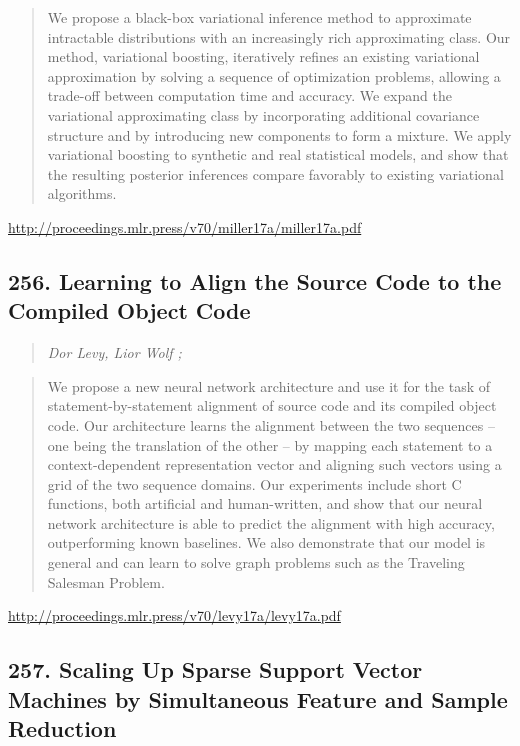 \documentclass{article}
\begin{document}
\begin{quote}
    We propose a black-box variational inference method to approximate intractable distributions with an increasingly rich approximating class. Our method, variational boosting, iteratively refines an existing variational approximation by solving a sequence of optimization problems, allowing a trade-off between computation time and accuracy. We expand the variational approximating class by incorporating additional covariance structure and by introducing new components to form a mixture. We apply variational boosting to synthetic and real statistical models, and show that the resulting posterior inferences compare favorably to existing variational algorithms.  \end{quote}

\href{http://proceedings.mlr.press/v70/miller17a/miller17a.pdf}{http://proceedings.mlr.press/v70/miller17a/miller17a.pdf}

\subsection{256. Learning to Align the Source Code to the Compiled Object Code}

\begin{quote}
\footnotesize{\textit{Dor Levy, Lior Wolf ;}}
\end{quote}

\begin{quote}
    We propose a new neural network architecture and use it for the task of statement-by-statement alignment of source code and its compiled object code. Our architecture learns the alignment between the two sequences – one being the translation of the other – by mapping each statement to a context-dependent representation vector and aligning such vectors using a grid of the two sequence domains. Our experiments include short C functions, both artificial and human-written, and show that our neural network architecture is able to predict the alignment with high accuracy, outperforming known baselines. We also demonstrate that our model is general and can learn to solve graph problems such as the Traveling Salesman Problem.  \end{quote}

\href{http://proceedings.mlr.press/v70/levy17a/levy17a.pdf}{http://proceedings.mlr.press/v70/levy17a/levy17a.pdf}

\subsection{257. Scaling Up Sparse Support Vector Machines by Simultaneous Feature and Sample Reduction}
\end{document}
